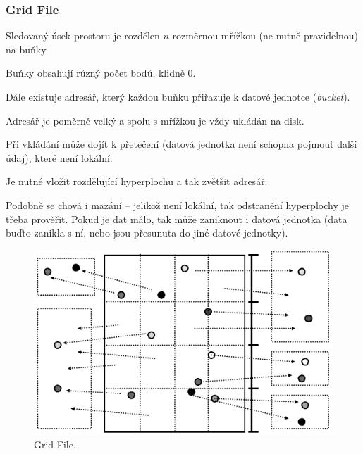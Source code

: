 \subsubsection{Grid File}

\begin{compactitem}
    \item Sledovaný úsek prostoru je rozdělen $n$-rozměrnou mřížkou (ne nutně pravidelnou) na buňky. \begin{compactitem}
        \item Buňky obsahují různý počet bodů, klidně 0.
    \end{compactitem}

    \item Dále existuje adresář, který každou buňku přiřazuje k datové jednotce (\textit{bucket}). \begin{compactitem}
        \item Adresář je poměrně velký a spolu s mřížkou je vždy ukládán na disk.
    \end{compactitem}

    \item Při vkládání může dojít k přetečení (datová jednotka není schopna pojmout další údaj), které není lokální. \begin{compactitem}
        \item Je nutné vložit rozdělující hyperplochu a tak zvětšit adresář.
        \item Podobně se chová i mazání -- jelikož není lokální, tak odstranění hyperplochy je třeba prověřit. Pokud je dat málo, tak může zaniknout i datová jednotka (data buďto zanikla s ní, nebo jsou přesunuta do jiné datové jednotky).
    \end{compactitem}
\end{compactitem}

\begin{figure}[H]
    \centering
    \includegraphics[width=0.75\linewidth]{grid_file.pdf}
    \caption{Grid File.}
\end{figure}


